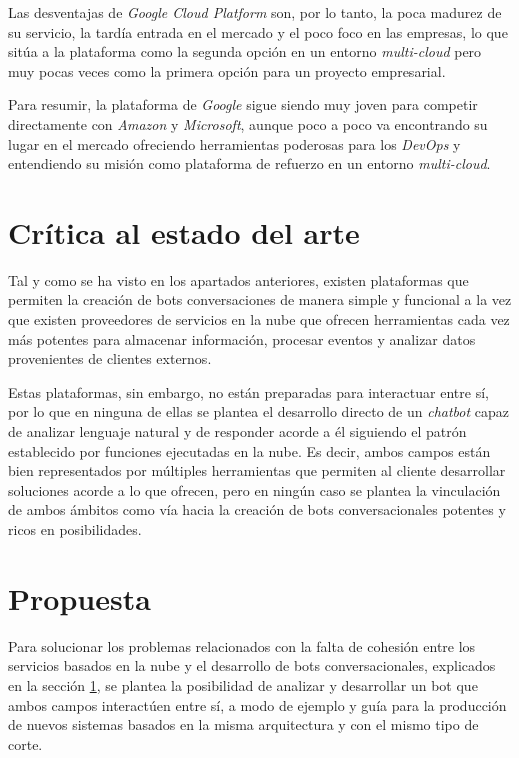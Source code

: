 \documentclass[11pt,spanish,listoffigures]{tfgetsinf}
\begin{document}
Las desventajas de \textit{Google Cloud Platform} son, por lo tanto, la poca madurez de su servicio, la tardía entrada en el mercado y el poco foco en las empresas, lo que sitúa a la plataforma como la segunda opción en un entorno \textit{multi-cloud} pero muy pocas veces como la primera opción para un proyecto empresarial.

Para resumir, la plataforma de \textit{Google} sigue siendo muy joven para competir directamente con \textit{Amazon} y \textit{Microsoft}, aunque poco a poco va encontrando su lugar en el mercado ofreciendo herramientas poderosas para los \textit{DevOps} \cite{devops} y entendiendo su misión como plataforma de refuerzo en un entorno \textit{multi-cloud}.


\section{Crítica al estado del arte}
\label{sec:critica-estado}

Tal y como se ha visto en los apartados anteriores, existen plataformas que permiten la creación de bots conversaciones de manera simple y funcional a la vez que existen proveedores de servicios en la nube que ofrecen herramientas cada vez más potentes para almacenar información, procesar eventos y analizar datos provenientes de clientes externos.

Estas plataformas, sin embargo, no están preparadas para interactuar entre sí, por lo que en ninguna de ellas se plantea el desarrollo directo de un \textit{chatbot} capaz de analizar lenguaje natural y de responder acorde a él siguiendo el patrón establecido por funciones ejecutadas en la nube. Es decir, ambos campos están bien representados por múltiples herramientas que permiten al cliente desarrollar soluciones acorde a lo que ofrecen, pero en ningún caso se plantea la vinculación de ambos ámbitos como vía hacia la creación de bots conversacionales potentes y ricos en posibilidades.


\section{Propuesta}
\label{sec:propuesta}

Para solucionar los problemas relacionados con la falta de cohesión entre los servicios basados en la nube y el desarrollo de bots conversacionales, explicados en la sección \ref{sec:critica-estado}, se plantea la posibilidad de analizar y desarrollar un bot que ambos campos interactúen entre sí, a modo de ejemplo y guía para la producción de nuevos sistemas basados en la misma arquitectura y con el mismo tipo de corte.
\end{document}
